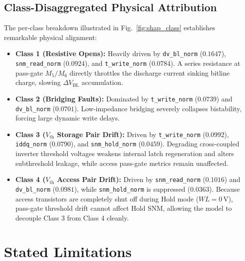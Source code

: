 \documentclass[conference]{IEEEtran}
\begin{document}
\subsection{Class-Disaggregated Physical Attribution}
The per-class breakdown illustrated in Fig.~\ref{fig:shap_class} establishes remarkable physical alignment:
\begin{itemize}
    \item \textbf{Class 1 (Resistive Opens):} Heavily driven by \texttt{dv\_bl\_norm} ($0.1647$), \texttt{snm\_read\_norm} ($0.0924$), and \texttt{t\_write\_norm} ($0.0784$). A series resistance at pass-gate $M_5/M_6$ directly throttles the discharge current sinking bitline charge, slowing $\Delta V_{\text{BL}}$ accumulation.
    \item \textbf{Class 2 (Bridging Faults):} Dominated by \texttt{t\_write\_norm} ($0.0739$) and \texttt{dv\_bl\_norm} ($0.0701$). Low-impedance bridging severely collapses bistability, forcing large dynamic write delays.
    \item \textbf{Class 3 ($V_{\text{th}}$ Storage Pair Drift):} Driven by \texttt{t\_write\_norm} ($0.0992$), \texttt{iddq\_norm} ($0.0790$), and \texttt{snm\_hold\_norm} ($0.0459$). Degrading cross-coupled inverter threshold voltages weakens internal latch regeneration and alters subthreshold leakage, while access pass-gate metrics remain unaffected.
    \item \textbf{Class 4 ($V_{\text{th}}$ Access Pair Drift):} Driven by \texttt{snm\_read\_norm} ($0.1016$) and \texttt{dv\_bl\_norm} ($0.0981$), while \texttt{snm\_hold\_norm} is suppressed ($0.0363$). Because access transistors are completely shut off during Hold mode ($WL=0\,\text{V}$), pass-gate threshold drift cannot affect Hold SNM, allowing the model to decouple Class 3 from Class 4 cleanly.
\end{itemize}


\section{Stated Limitations}
\label{sec:limits}
\end{document}

